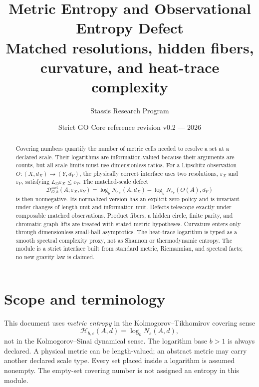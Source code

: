 \documentclass[11pt,a4paper]{article}
\title{\bfseries Metric Entropy and Observational Entropy Defect\\
\large Matched resolutions, hidden fibers, curvature, and heat-trace complexity}
\author{Stassis Research Program}
\date{Strict GO Core reference revision v0.2 --- 2026}
\theoremstyle{definition}
\theoremstyle{plain}
\theoremstyle{remark}
\newcommand{\Hmet}{\mathscr{H}}
\newcommand{\Dmet}{\mathscr{D}^{\mathrm{met}}}
\begin{document}
\maketitle

\begin{center}
\end{center}

\begin{abstract}
Covering numbers quantify the number of metric cells needed to resolve a
set at a declared scale. Their logarithms are information-valued because
their arguments are counts, but all scale limits must use dimensionless
ratios. For a Lipschitz observation
$O:(X,d_X)\to(Y,d_Y)$, the physically correct interface uses two
resolutions, $\varepsilon_X$ and $\varepsilon_Y$, satisfying
$L_O\varepsilon_X\leq\varepsilon_Y$. The matched-scale defect
\[
\Dmet_{O,b}(A;\varepsilon_X,\varepsilon_Y)
=
\log_b N_{\varepsilon_X}(A,d_X)
-
\log_b N_{\varepsilon_Y}(O(A),d_Y)
\]
is then nonnegative. Its normalized version has an explicit zero policy
and is invariant under changes of length unit and information unit.
Defects telescope exactly under composable matched observations. Product
fibers, a hidden circle, finite parity, and chromatic graph lifts are
treated with stated metric hypotheses. Curvature enters only through
dimensionless small-ball asymptotics. The heat-trace logarithm is typed as
a smooth spectral complexity proxy, not as Shannon or thermodynamic
entropy. The module is a strict interface built from standard metric,
Riemannian, and spectral facts; no new gravity law is claimed.
\end{abstract}

\tableofcontents

\section{Scope and terminology}

This document uses \emph{metric entropy} in the
Kolmogorov--Tikhomirov covering sense
\[
\Hmet_{b,\varepsilon}(A,d)=\log_bN_\varepsilon(A,d),
\]
not in the Kolmogorov--Sinai dynamical sense. The logarithm base $b>1$ is
always declared. A physical metric can be length-valued; an abstract metric
may carry another declared scale type. Every set placed inside a logarithm
is assumed nonempty. The empty-set covering number is not assigned an
entropy in this module.
\end{document}
